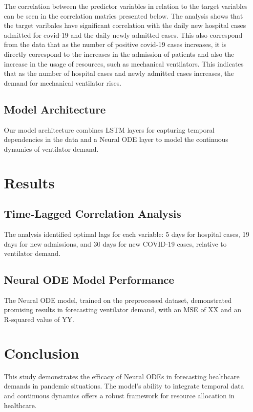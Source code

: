 \documentclass[lettersize, journal]{IEEEtran}
\begin{document}
The correlation between the predictor variables in relation to the target variables can be seen in the correlation matrics presented below. The analysis shows that the target varibales have significant correlation with the daily new hospital cases admitted for covid-19 and the daily newly admitted cases. This also correspond from the data that as the number of positive covid-19 cases increases, it is directly correspond to the increases in the admission of patients and also the increase in the usage of resources, such as mechanical ventilators. This indicates that as the number of hospital cases and newly admitted cases increases, the demand for mechanical ventilator rises. 

\subsection{Model Architecture}
Our model architecture combines LSTM layers for capturing temporal dependencies in the data and a Neural ODE layer to model the continuous dynamics of ventilator demand.

\section{Results}
\subsection{Time-Lagged Correlation Analysis}
The analysis identified optimal lags for each variable: 5 days for hospital cases, 19 days for new admissions, and 30 days for new COVID-19 cases, relative to ventilator demand.

\subsection{Neural ODE Model Performance}
The Neural ODE model, trained on the preprocessed dataset, demonstrated promising results in forecasting ventilator demand, with an MSE of XX and an R-squared value of YY.

\section{Conclusion}
This study demonstrates the efficacy of Neural ODEs in forecasting healthcare demands in pandemic situations. The model's ability to integrate temporal data and continuous dynamics offers a robust framework for resource allocation in healthcare.


\end{document}

